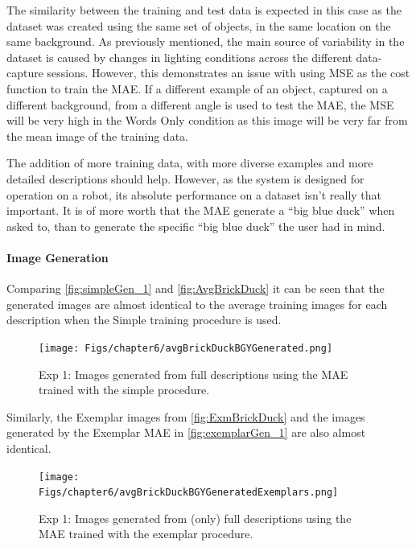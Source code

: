 The similarity between the training and test data is expected in this case as the dataset was created using the same set of objects, in the same location on the same background. As previously mentioned, the main source of variability in the dataset is caused by changes in lighting conditions across the different data-capture sessions. However, this demonstrates an issue with using \ac{MSE} as the cost function to train the \ac{MAE}. If a different example of an object, captured on a different background, from a different angle is used to test the \ac{MAE}, the \ac{MSE} will be very high in the Words Only condition as this image will be very far from the mean image of the training data. 

The addition of more training data, with more diverse examples and more detailed descriptions should help. However, as the system is designed for operation on a robot, its absolute performance on a dataset isn't really that important. It is of more worth that the \ac{MAE} generate a ``big blue duck'' when asked to, than to generate the specific ``big blue duck'' the user had in mind.

\paragraph{Image Generation}

Comparing \autoref{fig:simpleGen_1} and \autoref{fig:AvgBrickDuck} it can be seen that the generated images are almost identical to the average training images for each description when the Simple training procedure is used. 

\begin{figure}[ht]
    \centering
    \texttt{[image: Figs/chapter6/avgBrickDuckBGYGenerated.png]}
    \caption{Exp 1: Images generated from full descriptions using the \ac{MAE} trained with the simple procedure.}
    \label{fig:simpleGen_1}
\end{figure}

Similarly, the Exemplar images from \autoref{fig:ExmBrickDuck} and the images generated by the Exemplar \ac{MAE} in \autoref{fig:exemplarGen_1} are also almost identical.

\begin{figure}[ht]
    \centering
    \texttt{[image: Figs/chapter6/avgBrickDuckBGYGeneratedExemplars.png]}
    \caption{Exp 1: Images generated from (only) full descriptions using the MAE trained with the exemplar procedure.}
    \label{fig:exemplarGen_1}
\end{figure}

